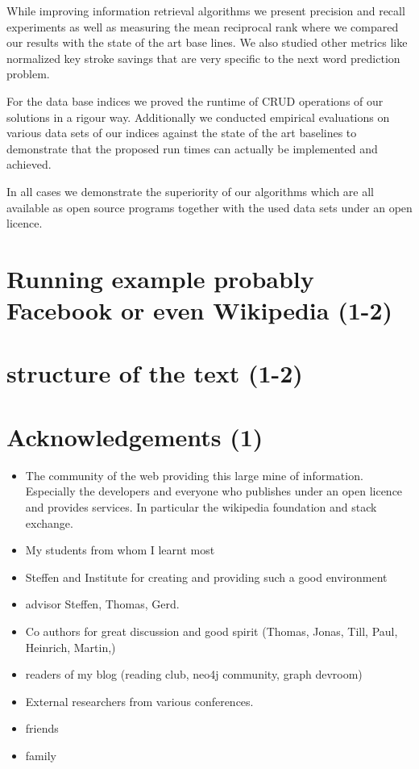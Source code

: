 \documentclass[•]{book}
\begin{document}
While improving information retrieval algorithms we present precision and recall experiments as well as measuring the mean reciprocal rank where we compared our results with the state of the art base lines. 
We also studied other metrics like normalized key stroke savings that are very specific to the next word prediction problem.

For the data base indices we proved the runtime of CRUD operations of our solutions in a rigour way. 
Additionally we conducted empirical evaluations on various data sets of our indices against the state of the art baselines to demonstrate that the proposed run times can actually be implemented and achieved.

In all cases we demonstrate the superiority of our algorithms which are all available as open source programs together with the used data sets under an open licence.
\section{Running example probably Facebook or even Wikipedia (1-2)}

\section{structure of the text (1-2)}

\section{Acknowledgements (1)}
\begin{itemize}
\item The community of the web providing this large mine of information. Especially the developers and everyone who publishes under an open licence and provides services. In particular the wikipedia foundation and stack exchange. 
\item My students from whom I learnt most
\item Steffen and Institute for creating and providing such a good environment
\item advisor Steffen, Thomas, Gerd.
\item Co authors for great discussion and good spirit (Thomas, Jonas, Till, Paul, Heinrich, Martin,)
\item readers of my blog (reading club, neo4j community, graph devroom)
\item External researchers from various conferences.
\item friends
\item family 

\end{itemize}
\end{document}
